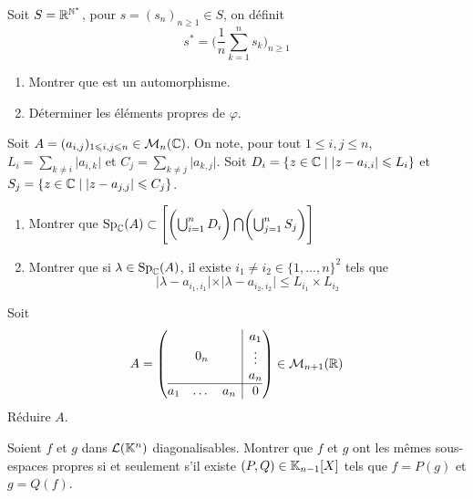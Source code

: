 \documentclass[12pt]{article}
\begin{document}
\begin{exercise}
	Soit $S=\mathbb{R}^{\mathbb{N}^{*}}$, pour $s=(s_{n})_{n\geqslant1}\in S$, on définit 
	$$s^{*}=\Biggl(\frac{1}{n}\sum_{k=1}^{n}s_{k}\Biggr)_{n\geqslant1}$$
	\begin{enumerate}
		\item Montrer que  est un automorphisme.
		\item Déterminer les éléments propres de $\varphi$.
	\end{enumerate}
\end{exercise}

\begin{exercise}
	Soit $A=(a_{i,j})_{1\leqslant i,j\leqslant n}\in\mathcal{M}_{n}(\mathbb{C})$. On note, pour tout $1\leqslant i,j\leqslant n$, $L_{i}=\sum_{k\neq i}\vert a_{i,k}\vert$ et $C_{j}=\sum_{k\neq j}\vert a_{k,j}\vert$. Soit $D_{i}=\{z\in\mathbb{C}\mid\vert z-a_{i,i}\vert\leqslant L_{i}\}$ et $S_{j}=\{z\in\mathbb{C}\mid\vert z-a_{j,j}\vert\leqslant C_{j}\}$.
	\begin{enumerate}
		\item Montrer que $\operatorname{Sp}_{\mathbb{C}}(A)\subset\Biggl[\biggl(\bigcup_{i=1}^{n}D_{i}\biggr)\bigcap \biggl(\bigcup_{j=1}^{n}S_{j}\biggr)\Biggr]$
		\item Montrer que si $\lambda\in\operatorname{Sp}_{\mathbb{C}}(A)$, il existe $i_{1}\neq i_{2}\in\{1,\dots,n\}^{2}$ tels que 
		$$\vert\lambda-a_{i_{1},i_{1}}\vert\times\vert\lambda-a_{i_{2},i_{2}}\vert\leqslant L_{i_{1}}\times L_{i_{2}}$$
	\end{enumerate}
\end{exercise}

\begin{exercise}
	Soit 
	$$
	A=
	\left(
		\begin{array}{@{}c|c@{}}
		0_{n} &
		\begin{matrix}
			a_{1}\\
			\vdots\\
			a_{n}
			\end{matrix}
			\\
		\hline
		\begin{matrix}
			a_{1} &
			\dots
			& a_{n}
			\end{matrix}
			& 0
		\end{array}
		\right)\in \M_{n+1}(\R)
	$$
	Réduire $A$.
\end{exercise}

\begin{exercise}
	Soient $f$ et $g$ dans $\mathcal{L}(\mathbb{K}^{n})$ diagonalisables. Montrer que $f$ et $g$ ont les mêmes sous-espaces propres si et seulement s'il existe $(P,Q)\in\mathbb{K}_{n-1}[X]$ tels que $f=P(g)$ et $g=Q(f)$.
\end{exercise}
\end{document}
